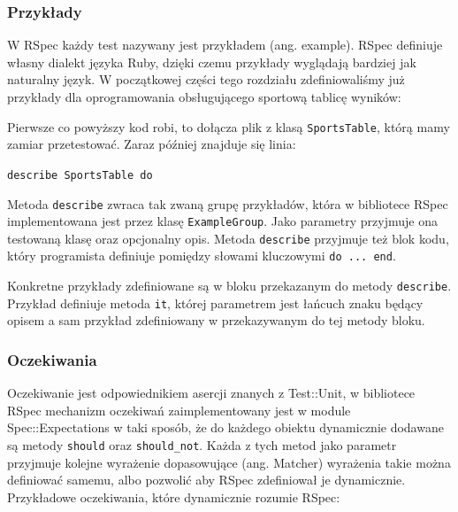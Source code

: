     \subsubsection{Przykłady}
    W RSpec każdy test nazywany jest przykładem (ang. example). RSpec definiuje własny dialekt języka Ruby, dzięki czemu przykłady wyglądają bardziej jak naturalny język. W początkowej części tego rozdziału zdefiniowaliśmy już przykłady dla oprogramowania obsługującego sportową tablicę wyników:
    
    
    
    Pierwsze co powyższy kod robi, to dołącza plik z klasą \verb+SportsTable+, którą mamy zamiar przetestować. Zaraz później znajduje się linia:
    
    \verb+describe SportsTable do+
    
    Metoda \verb+describe+ zwraca tak zwaną grupę przykładów, która w bibliotece RSpec implementowana jest przez klasę \verb+ExampleGroup+. Jako parametry przyjmuje ona testowaną klasę oraz opcjonalny opis. Metoda \verb+describe+ przyjmuje też blok kodu, który programista definiuje pomiędzy słowami kluczowymi \verb+do ... end+.
    
    Konkretne przykłady zdefiniowane są w bloku przekazanym do metody \verb+describe+. Przykład definiuje metoda \verb+it+, której parametrem jest łańcuch znaku będący opisem a sam przykład zdefiniowany w przekazywanym do tej metody bloku.
    
    \subsubsection{Oczekiwania}
    Oczekiwanie jest odpowiednikiem asercji znanych z Test::Unit, w bibliotece RSpec mechanizm oczekiwań zaimplementowany jest w module Spec::Expectations w taki sposób, że do każdego obiektu dynamicznie dodawane są metody \verb+should+ oraz \verb+should_not+. Każda z tych metod jako parametr przyjmuje kolejne wyrażenie dopasowujące (ang. Matcher) wyrażenia takie można definiować samemu, albo pozwolić aby RSpec zdefiniował je dynamicznie. Przykładowe oczekiwania, które dynamicznie rozumie RSpec:
    
    
    
